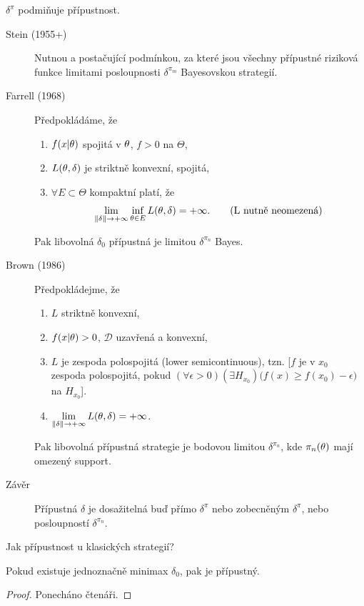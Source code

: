 \begin{remark}
	$\delta^\pi$ podmiňuje přípustnost.\begin{description}
		\item[Stein (1955+)] Nutnou a postačující podmínkou, za které jsou všechny přípustné riziková funkce limitami posloupnosti $\delta^{\pi_m}$ Bayesovskou strategií.
		\item[Farrell (1968)] Předpokládáme, že \begin{enumerate}[1)]
			\item $f(x|\theta)$ spojitá v $\theta$, $f>0$ na $\Theta$,
			\item $L(\theta,\delta)$ je striktně konvexní, spojitá,
			\item $\forall E\subset\Theta$ kompaktní platí, že 
			$$ \lim\limits_{\left\|\delta\right\|\to+\infty}\inf\limits_{\theta\in E}L(\theta,\delta)=+\infty.\qquad(\text{L nutně neomezená})$$ 
		\end{enumerate}
	Pak libovolná $\delta_0$ přípustná je limitou $\delta^{\pi_n}$ Bayes.
	\item[Brown (1986)] Předpokládejme, že \begin{enumerate}[1)]
		\item $L$ striktně konvexní,
		\item $f(x|\theta)>0$, $\mathscr{D}$ uzavřená a konvexní,
		\item $L$ je zespoda polospojitá (lower semicontinuous), tzn. [$f$ je v $x_0$ zespoda polospojitá, pokud $(\forall\epsilon>0)(\exists H_{x_0})\big(f(x)\geq f(x_0)-\epsilon\big)$ na $H_{x_0}$].
		\item $\lim\limits_{\left\|\delta\right\|\to+\infty} L(\theta,\delta)=+\infty$.
	\end{enumerate}
Pak libovolná přípustná strategie je bodovou limitou $\delta^{\pi_n}$, kde $\pi_n(\theta)$ mají omezený support.
\item[Závěr] Přípustná $\delta$ je dosažitelná buď přímo $\delta^\pi$ nebo zobecněným $\delta^\pi$, nebo posloupností $\delta^{\pi_n}$.
	\end{description}
\end{remark}
Jak přípustnost u klasických strategií?
\begin{theorem}
	Pokud existuje jednoznačně minimax $\delta_0$, pak je přípustný.\begin{proof}
		Ponecháno čtenáři.
	\end{proof}
\end{theorem}
